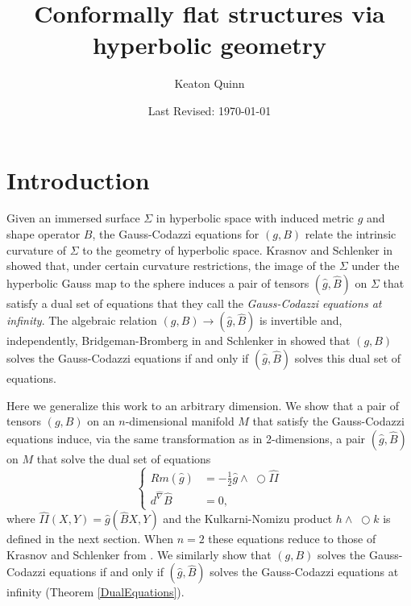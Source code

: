\documentclass{amsart}
\newcommand{\two}{I\!\!I}
\newcommand{\wtimes}{\wedge \!\!\!\!\!\!\!\!\;\bigcirc}
\begin{document}
\title{Conformally flat structures via hyperbolic geometry}
\author{Keaton Quinn}
\date{Last Revised: \today}

\begin{abstract}
\end{abstract}

\maketitle

\section{Introduction}

Given an immersed surface $\Sigma$ in hyperbolic space with induced metric $g$ and shape operator $B$, the Gauss-Codazzi equations for $(g,B)$ relate the intrinsic curvature of $\Sigma$ to the geometry of hyperbolic space.
Krasnov and Schlenker in \cite{Krasnov-Schlenker2008} showed that, under certain curvature restrictions, the image of the $\Sigma$ under the hyperbolic Gauss map to the sphere induces a pair of tensors $(\hat{g},\hat{B})$ on $\Sigma$ that satisfy a dual set of equations that they call the \emph{Gauss-Codazzi equations at infinity}. 
The algebraic relation $(g,B) \to (\hat{g},\hat{B})$ is invertible and, independently, Bridgeman-Bromberg in \cite{Bridgeman-Bromberg2022} and Schlenker in \cite{Schlenker2017} showed that $(g,B)$ solves the Gauss-Codazzi equations if and only if $(\hat{g},\hat{B})$ solves this dual set of equations. 

Here we generalize this work to an arbitrary dimension.
We show that a pair of tensors $(g,B)$ on an $n$-dimensional manifold $M$ that satisfy the Gauss-Codazzi equations induce, via the same transformation as in 2-dimensions, a pair $(\hat{g},\hat{B})$ on $M$ that solve the dual set of equations
\[
\left\{
\begin{aligned}
Rm(\hat{g}) &= -\frac{1}{2}\hat{g}\wtimes \hat{\two} \\
d^{\hat{\nabla}}\hat{B} &= 0,
\end{aligned}
\right.
\]
where $\hat{\two}(X,Y) = \hat{g}(\hat{B}X,Y)$ and the Kulkarni-Nomizu product $h\wtimes k$ is defined in the next section.
When $n=2$ these equations reduce to those of Krasnov and Schlenker from \cite{Krasnov-Schlenker2008}. 
We similarly show that $(g,B)$ solves the Gauss-Codazzi equations if and only if $(\hat{g},\hat{B})$ solves the Gauss-Codazzi equations at infinity (Theorem \ref{DualEquations}).
\end{document}
